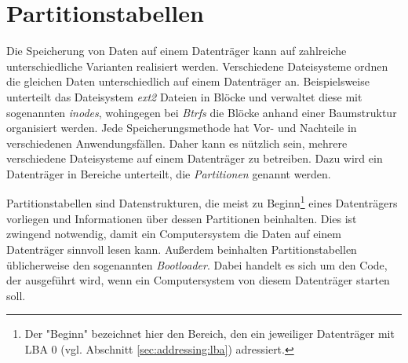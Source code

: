 \section{Partitionstabellen}
Die Speicherung von Daten auf einem Datenträger kann auf zahlreiche unterschiedliche Varianten realisiert werden.
Verschiedene Dateisysteme ordnen die gleichen Daten unterschiedlich auf einem Datenträger an.
Beispielsweise unterteilt das Dateisystem \textit{ext2} Dateien in Blöcke und verwaltet diese mit sogenannten \textit{inodes}, wohingegen bei \textit{Btrfs} die Blöcke anhand einer Baumstruktur organisiert werden. 
Jede Speicherungsmethode hat Vor- und Nachteile in verschiedenen Anwendungsfällen. Daher kann es nützlich sein, mehrere verschiedene Dateisysteme auf einem Datenträger zu betreiben.
Dazu wird ein Datenträger in Bereiche unterteilt, die \textit{Partitionen} genannt werden.

Partitionstabellen sind Datenstrukturen, die meist zu Beginn\footnote{
    Der "Beginn" bezeichnet hier den Bereich, den ein jeweiliger Datenträger mit LBA 0 (vgl. Abschnitt \ref{sec:addressing:lba}) adressiert.
}
eines Datenträgers vorliegen und Informationen über dessen Partitionen beinhalten.
Dies ist zwingend notwendig, damit ein Computersystem die Daten auf einem Datenträger sinnvoll lesen kann.
Außerdem beinhalten Partitionstabellen üblicherweise den sogenannten \textit{Bootloader}. Dabei handelt es sich um den Code, der ausgeführt wird, wenn ein Computersystem von diesem Datenträger starten soll.